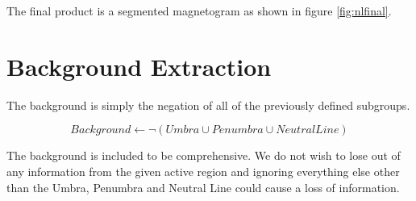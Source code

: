The final product is a segmented magnetogram as shown in figure \ref{fig:nlfinal}. 

\section{Background Extraction}

The background is simply the negation of all of the previously defined subgroups.

$$Background \gets \neg(Umbra \cup Penumbra \cup Neutral Line)$$

The background is included to be comprehensive. We do not wish to lose out of any information from the given active region and ignoring everything else other than the Umbra, Penumbra and Neutral Line could cause a loss of information.

